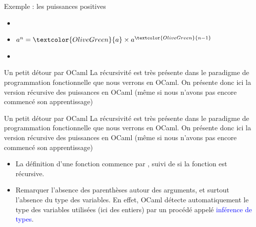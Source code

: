 \documentclass[10pt]{beamer}
\begin{document}
\begin{frame}[fragile]{\Ctitle}{\stitle}
	\begin{exampleblock}{Exemple : les puissances positives}
		\begin{itemize}
			\item[]<1-> 
			\item<2-> $a^n = \textcolor{OliveGreen}{a} \times a^{\textcolor{OliveGreen}{n-1}}$
			\item[]<3-> 
		\end{itemize}
	\end{exampleblock}
\end{frame}

\begin{frame}[fragile]{\Ctitle}{\stitle}
	\begin{block}{Un petit détour par OCaml}
		La récursivité est très présente dans le paradigme de programmation fonctionnelle que nous verrons en OCaml.
		On présente donc ici la version récursive des puissances en OCaml (même si nous n'avons pas encore commencé son apprentissage)
		\onslide<2->
	\end{block}
\end{frame}

\begin{frame}[fragile]{\Ctitle}{\stitle}
	\begin{block}{Un petit détour par OCaml}
		La récursivité est très présente dans le paradigme de programmation fonctionnelle que nous verrons en OCaml.
		On présente donc ici la version récursive des puissances en OCaml (même si nous n'avons pas encore commencé son apprentissage)
		\begin{itemize}
			\item <2-> La définition d'une fonction commence par , suivi de  si la fonction est récursive.
			\item <3-> Remarquer l'absence des parenthèses autour des arguments, et surtout l'absence du type des variables. En effet, OCaml détecte automatiquement le type des variables utilisées (ici des entiers) par un procédé appelé \textcolor{blue}{inférence de types}.
		\end{itemize}
	\end{block}
\end{frame}
\end{document}
